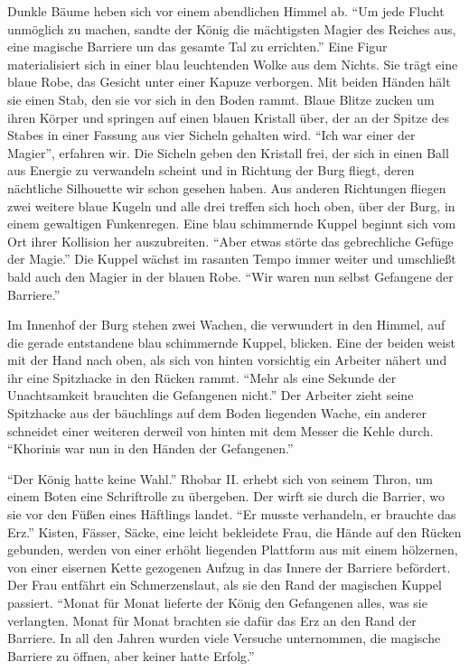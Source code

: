 \documentclass[a5paper,pagesize]{scrbook}
\begin{document}
Dunkle Bäume heben sich vor einem abendlichen Himmel ab.
\enquote{Um jede Flucht unmöglich zu machen, sandte der König die mächtigsten Magier des Reiches aus, eine magische Barriere um das gesamte Tal zu errichten.}
Eine Figur materialisiert sich in einer blau leuchtenden Wolke aus dem Nichts.
Sie trägt eine blaue Robe, das Gesicht unter einer Kapuze verborgen.
Mit beiden Händen hält sie einen Stab, den sie vor sich in den Boden rammt.
Blaue Blitze zucken um ihren Körper und springen auf einen blauen Kristall über, der an der Spitze des Stabes in einer Fassung aus vier Sicheln gehalten wird.
\enquote{Ich war einer der Magier}, erfahren wir.
Die Sicheln geben den Kristall frei, der sich in einen Ball aus Energie zu verwandeln scheint und in Richtung der Burg fliegt, deren nächtliche Silhouette wir schon gesehen haben.
Aus anderen Richtungen fliegen zwei weitere blaue Kugeln und alle drei treffen sich hoch oben, über der Burg, in einem gewaltigen Funkenregen.
Eine blau schimmernde Kuppel beginnt sich vom Ort ihrer Kollision her auszubreiten.
\enquote{Aber etwas störte das gebrechliche Gefüge der Magie.}
Die Kuppel wächst im rasanten Tempo immer weiter und umschließt bald auch den Magier in der blauen Robe.
\enquote{Wir waren nun selbst Gefangene der Barriere.}

Im Innenhof der Burg stehen zwei Wachen, die verwundert in den Himmel, auf die gerade entstandene blau schimmernde Kuppel, blicken.
Eine der beiden weist mit der Hand nach oben, als sich von hinten vorsichtig ein Arbeiter nähert und ihr eine Spitzhacke in den Rücken rammt.
\enquote{Mehr als eine Sekunde der Unachtsamkeit brauchten die Gefangenen nicht.}
Der Arbeiter zieht seine Spitzhacke aus der bäuchlings auf dem Boden liegenden Wache, ein anderer schneidet einer weiteren derweil von hinten mit dem Messer die Kehle durch.
\enquote{Khorinis war nun in den Händen der Gefangenen.}

\enquote{Der König hatte keine Wahl.}
Rhobar II. erhebt sich von seinem Thron, um einem Boten eine Schriftrolle zu übergeben.
Der wirft sie durch die Barrier, wo sie vor den Füßen eines Häftlings landet.
\enquote{Er musste verhandeln, er brauchte das Erz.}
Kisten, Fässer, Säcke, eine leicht bekleidete Frau, die Hände auf den Rücken gebunden, werden von einer erhöht liegenden Plattform aus mit einem hölzernen, von einer eisernen Kette gezogenen Aufzug in das Innere der Barriere befördert.
Der Frau entfährt ein Schmerzenslaut, als sie den Rand der magischen Kuppel passiert.
\enquote{Monat für Monat lieferte der König den Gefangenen alles, was sie verlangten.
Monat für Monat brachten sie dafür das Erz an den Rand der Barriere.
In all den Jahren wurden viele Versuche unternommen, die magische Barriere zu öffnen, aber keiner hatte Erfolg.}
\end{document}
